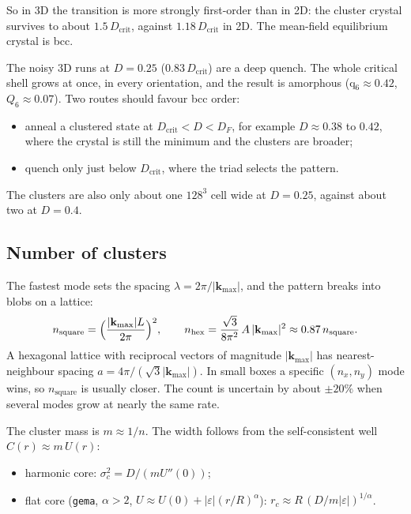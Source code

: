\documentclass[11pt]{article}
\newcommand{\code}[1]{\texttt{#1}}
\begin{document}
So in 3D the transition is more strongly first-order than in 2D: the cluster
crystal survives to about $1.5\,D_{\mathrm{crit}}$, against
$1.18\,D_{\mathrm{crit}}$ in 2D. The mean-field equilibrium crystal is bcc.

The noisy 3D runs at $D=0.25$ ($0.83\,D_{\mathrm{crit}}$) are a deep quench.
The whole critical shell grows at once, in every orientation, and the result
is amorphous (q$_6\approx0.42$, $Q_6\approx0.07$). Two routes should favour
bcc order:
\begin{itemize}
  \item anneal a clustered state at $D_{\mathrm{crit}}<D<D_F$, for example
        $D\approx0.38$ to $0.42$, where the crystal is still the minimum and
        the clusters are broader;
  \item quench only just below $D_{\mathrm{crit}}$, where the triad
        selects the pattern.
\end{itemize}
The clusters are also only about one $128^3$ cell wide at $D=0.25$, against
about two at $D=0.4$.

\subsection{Number of clusters}
The fastest mode sets the spacing $\lambda = 2\pi/|\mathbf k_{\max}|$, and the
pattern breaks into blobs on a lattice:
\begin{equation}
  n_{\mathrm{square}} = \Bigl(\frac{|\mathbf k_{\max}|L}{2\pi}\Bigr)^2, \qquad
  n_{\mathrm{hex}} = \frac{\sqrt3}{8\pi^2}\,A\,|\mathbf k_{\max}|^2 \approx 0.87\,n_{\mathrm{square}} .
\end{equation}
A hexagonal lattice with reciprocal vectors of magnitude $|\mathbf k_{\max}|$
has nearest-neighbour spacing $a = 4\pi/(\sqrt3|\mathbf k_{\max}|)$. In small
boxes a specific $(n_x,n_y)$ mode wins, so $n_{\mathrm{square}}$ is usually
closer. The count is uncertain by about $\pm20\%$ when several modes grow at
nearly the same rate.

The cluster mass is $m\approx1/n$. The width follows from the self-consistent
well $C(r)\approx m\,U(r)$:
\begin{itemize}
  \item harmonic core: $\sigma_c^2 = D/(mU''(0))$;
  \item flat core (\code{gema}, $\alpha>2$, $U\approx U(0)+|\varepsilon|(r/R)^\alpha$):
        $r_c\approx R\,(D/m|\varepsilon|)^{1/\alpha}$.
\end{itemize}
\end{document}
